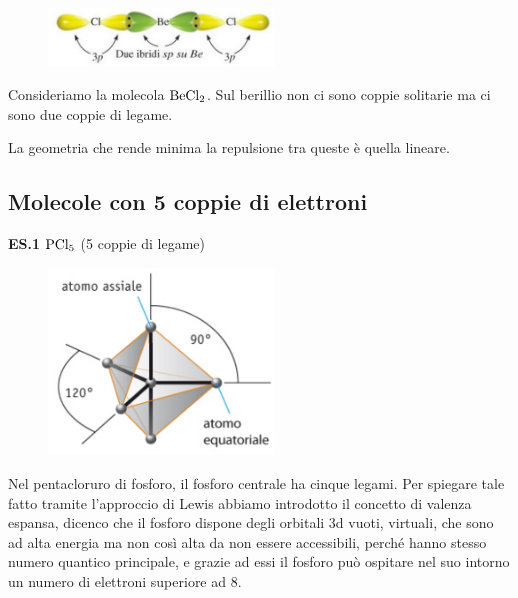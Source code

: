\begin{minipage}{0.4\textwidth}
    \begin{figure}[H]
        \includegraphics[width=6cm]{immagini/BeCl_2.png}
    \end{figure}
\end{minipage}
\hfill
\begin{minipage}{0.55\textwidth}
\vspace{0.4cm}Consideriamo la molecola $\rm BeCl_2$. Sul berillio non ci sono coppie solitarie ma ci sono due coppie di legame.

La geometria che rende minima la repulsione tra queste è quella lineare.
\end{minipage}

\subsection{Molecole con 5 coppie di elettroni}
\textbf{ES.1} $\rm PCl_5$ (5 coppie di legame)

\begin{minipage}{0.4\textwidth}
    \begin{figure}[H]
        \includegraphics[width=6cm]{immagini/PCl_5.png}
    \end{figure}
\end{minipage}
\hfill
\begin{minipage}{0.55\textwidth}
    \vspace{0.2cm}Nel pentacloruro di fosforo, il fosforo centrale ha cinque legami. Per spiegare tale fatto tramite l'approccio di Lewis abbiamo introdotto il concetto di valenza espansa, dicenco che il fosforo dispone degli orbitali 3d vuoti, virtuali, che sono ad alta energia ma non così alta da non essere accessibili, perché hanno stesso numero quantico principale, e grazie ad essi il fosforo può ospitare nel suo intorno un numero di elettroni superiore ad 8.
\end{minipage}

